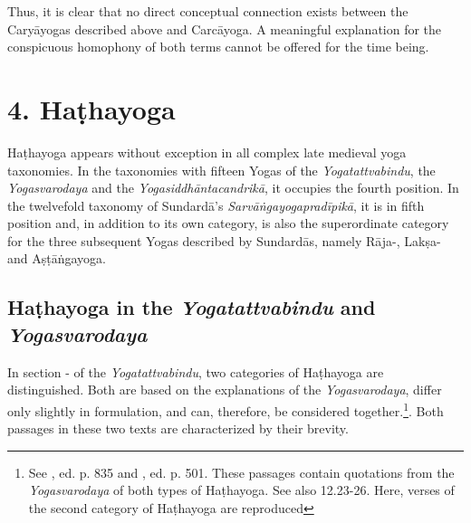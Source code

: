 Thus, it is clear that no direct conceptual connection exists between the Caryāyogas described above and Carcāyoga. A meaningful explanation for the conspicuous homophony of both terms cannot be offered for the time being.  

\section{4. Haṭhayoga}
\label{hathayogaintro}

Haṭhayoga appears without exception in all complex late medieval yoga taxonomies. In the taxonomies with fifteen Yogas of the \textit{Yogatattvabindu}, the \textit{Yogasvarodaya} and the \textit{Yogasiddhāntacandrikā}, it occupies the fourth position. In the twelvefold taxonomy of Sundardā's \textit{Sarvāṅgayogapradīpikā}, it is in fifth position and, in addition to its own category, is also the superordinate category for the three subsequent Yogas described by Sundardās, namely Rāja-, Lakṣa- and Aṣṭāṅgayoga.

\subsection{Haṭhayoga in the \textit{Yogatattvabindu} and \textit{Yogasvarodaya}}

In section - of the \textit{Yogatattvabindu}, two categories of Haṭhayoga are distinguished. Both are based on the explanations of the \textit{Yogasvarodaya}, differ only slightly in formulation, and can, therefore, be considered together.\footnote{See , ed. p. 835 and , ed. p. 501. These passages contain quotations from the \textit{Yogasvarodaya} of both types of Haṭhayoga. See also  12.23-26. Here, verses of the second category of Haṭhayoga are reproduced}. Both passages in these two texts are characterized by their brevity. 

